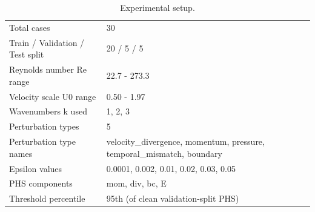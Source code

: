\begin{table}[t]
\centering
\caption{Experimental setup.}
\label{tab:setup}
\begin{tabular}{ll}
\hline
Total cases & 30 \\
Train / Validation / Test split & 20 / 5 / 5 \\
Reynolds number Re range & 22.7 - 273.3 \\
Velocity scale U0 range & 0.50 - 1.97 \\
Wavenumbers k used & 1, 2, 3 \\
Perturbation types & 5 \\
Perturbation type names & velocity\_divergence, momentum, pressure, temporal\_mismatch, boundary \\
Epsilon values & 0.0001, 0.002, 0.01, 0.02, 0.03, 0.05 \\
PHS components & mom, div, bc, E \\
Threshold percentile & 95th (of clean validation-split PHS) \\
\hline
\end{tabular}
\end{table}
